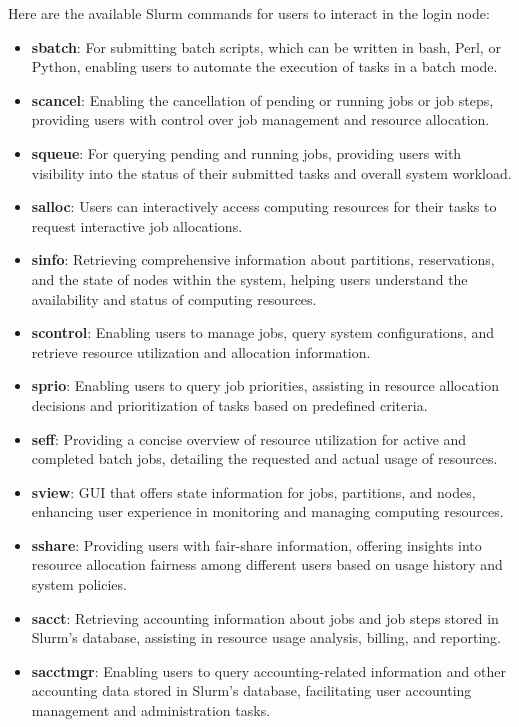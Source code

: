 Here are the available Slurm commands for users to interact in the login node:

\begin{itemize}
    \item \textbf{sbatch}: For submitting batch scripts, which can be written in bash, Perl, or Python, enabling users to automate the execution of tasks in a batch mode.
    \item \textbf{scancel}: Enabling the cancellation of pending or running jobs or job steps, providing users with control over job management and resource allocation.
    \item \textbf{squeue}: For querying pending and running jobs, providing users with visibility into the status of their submitted tasks and overall system workload.
    \item \textbf{salloc}: Users can interactively access computing resources for their tasks to request interactive job allocations.
    \item \textbf{sinfo}: Retrieving comprehensive information about partitions, reservations, and the state of nodes within the system, helping users understand the availability and status of computing resources.
    \item \textbf{scontrol}: Enabling users to manage jobs, query system configurations, and retrieve resource utilization and allocation information.
    \item \textbf{sprio}: Enabling users to query job priorities, assisting in resource allocation decisions and prioritization of tasks based on predefined criteria.
    \item \textbf{seff}: Providing a concise overview of resource utilization for active and completed batch jobs, detailing the requested and actual usage of resources.
    \item \textbf{sview}: GUI that offers state information for jobs, partitions, and nodes, enhancing user experience in monitoring and managing computing resources.
    \item \textbf{sshare}: Providing users with fair-share information, offering insights into resource allocation fairness among different users based on usage history and system policies.
    \item \textbf{sacct}: Retrieving accounting information about jobs and job steps stored in Slurm's database, assisting in resource usage analysis, billing, and reporting.
    \item \textbf{sacctmgr}: Enabling users to query accounting-related information and other accounting data stored in Slurm's database, facilitating user accounting management and administration tasks.

\end{itemize}
